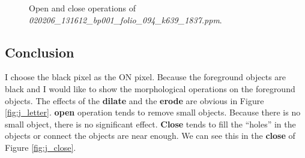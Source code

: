 \documentclass[paper=a4, fontsize=11pt]{scrartcl}
\numberwithin{equation}{section}		%
\numberwithin{figure}{section}			%
\numberwithin{table}{section}				%
\begin{document}
\begin{figure}[h]
\centering
{}
\caption{Open and close operations of \emph{020206\_131612\_bp001\_folio\_094\_k639\_1837.ppm}.}
\label{fig:morph:02}
\end{figure}

\subsection{Conclusion}

I choose the black pixel as the ON pixel.
Because the foreground objects are black and I would like to show the morphological operations on the foreground objects.
The effects of the \textbf{dilate} and the \textbf{erode} are obvious in Figure \ref{fig:j_letter}.
\textbf{open} operation tends to remove small objects.
Because there is no small object, there is no significant effect.
\textbf{Close} tends to fill the ``holes'' in the objects or connect the objects are near enough.
We can see this in the \textbf{close} of Figure \ref{fig:j_close}.
\end{document}
